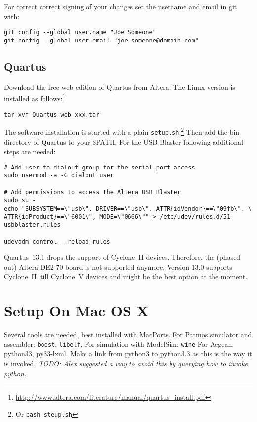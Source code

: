 \documentclass[a4paper,fontsize=10pt,twoside,DIV15,BCOR12mm,headinclude=true,footinclude=false,pagesize,bibtotoc]{scrbook}
\newcommand{\code}[1]{{\texttt{#1}}}
\newcommand{\todo}[1]{{\emph{TODO: #1}}}
\begin{document}
For correct correct signing of your changes set the username and
email in git with:

\begin{verbatim}
git config --global user.name "Joe Someone"
git config --global user.email "joe.someone@domain.com"
\end{verbatim}

\subsection{Quartus}

Download the free web edition of Quartus from Altera. The Linux version is
installed as follows:\footnote{\url{http://www.altera.com/literature/manual/quartus_install.pdf}}

\begin{verbatim}
tar xvf Quartus-web-xxx.tar
\end{verbatim}

The software installation is started with a plain \code{setup.sh}.\footnote{Or \code{bash steup.sh}}
Then add the bin directory of Quartus to your \$PATH.
%
For  the USB Blaster following additional steps are needed:

\begin{verbatim}
# Add user to dialout group for the serial port access
sudo usermod -a -G dialout user

# Add permissions to access the Altera USB Blaster
sudo su -
echo "SUBSYSTEM==\"usb\", DRIVER==\"usb\", ATTR{idVendor}==\"09fb\", \
ATTR{idProduct}==\"6001\", MODE=\"0666\"" > /etc/udev/rules.d/51-usbblaster.rules

udevadm control --reload-rules
\end{verbatim}

Quartus~13.1 drops the support of Cyclone~II devices. Therefore, the
(phased out) Altera DE2-70 board is not supported anymore. Version 13.0 supports Cyclone~II\
till Cyclone~V devices and might be the best option at the moment.

\section{Setup On Mac OS X}

Several tools are needed, best installed with MacPorts. For Patmos simulator and assembler:
\code{boost}, \code{libelf}.
For simulation with ModelSim: \code{wine}
For Aegean: python33, py33-lxml. Make a link from python3 to python3.3 as this is the way it is invoked.
\todo{Alex suggested a way to avoid this by querying how to invoke python.}
\end{document}
